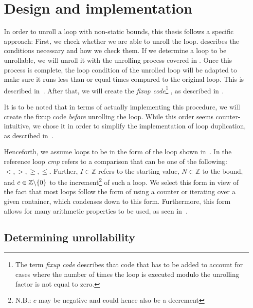 \chapter{Design and implementation}\label{sec:impl}

In order to unroll a loop with non-static bounds, this thesis follows a specific approach:
First, we check whether we are able to unroll the loop.
 describes the conditions necessary and how we check them.
If we determine a loop to be unrollable, we will unroll it with the unrolling process covered in .
Once this process is complete, the loop condition of the unrolled loop will be adapted to make sure it runs less than or equal times compared to the original loop.
This is described in~.
After that, we will create the \textit{fixup code}\footnote{The term \textit{fixup code} describes that code that has to be added to account for cases where the number of times the loop is executed modulo the unrolling factor is not equal to zero.}
, as described in .

It is to be noted that in terms of actually implementing this procedure, we will create the fixup code \textit{before} unrolling the loop.
While this order seems counter-intuitive, we chose it in order to simplify the implementation of loop duplication, as described in~.


Henceforth, we assume loops to be in the form of the loop shown in~.
In the reference loop \textit{cmp} refers to a comparison that can be one of the following: $<, >, \geq, \leq$.
Further, $I \in \mathbb{Z}$ refers to the starting value, $N \in \mathbb{Z}$ to the bound, and $c \in \mathbb{Z} \backslash \{0\}$ \label{sec:impl::def-c} to the increment\footnote{N.B.: $c$ may be negative and could hence also be a decrement} of such a loop.
We select this form in view of the fact that most loops follow the form of using a counter or iterating over a given container, which condenses down to this form.
Furthermore, this form allows for many arithmetic properties to be used, as seen in~.



\newpage

\section{Determining unrollability}\label{sec:impl:unrollability}

